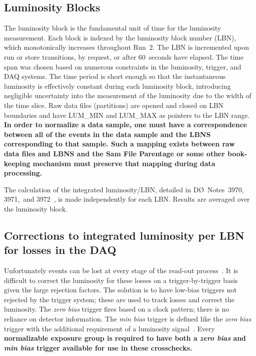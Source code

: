 \documentclass[12pt]{article}
\begin{document}
\subsection*{Luminosity Blocks}
The luminosity block is the fundamental unit of time for the
luminosity measurement.  Each block is indexed by the luminosity block
number (LBN), which monotonically increases throughout Run~2.  The LBN
is incremented upon run or store transitions, by request, or after
60~seconds have elapsed.  The time span was chosen based on numerous
constraints in the luminosity, trigger, and DAQ systems.  The time
period is short enough so that the instantaneous luminosity is
effectively constant during each luminosity block, introducing
negligible uncertainty into the measurement of the luminosity due to
the width of the time slice.  Raw data files (partitions) are opened
and closed on LBN boundaries and have LUM\_MIN and LUM\_MAX as pointers
to the LBN range. \bf
In order to normalize a data sample, one must have a correspondence between
all of the events in the data sample and the LBNS corresponding to that sample.
Such a mapping exists between raw data files and LBNS and the Sam File Parentage
or some other book-keeping mechanism must preserve that mapping during data processing. \rm


 The calculation of the integrated luminosity/LBN, detailed in
D\O~Notes~3970, 3971,~and 3972~\cite{3970,3971,3972}, is made
independently for each LBN.  Results are averaged over the luminosity
block.


\subsection*{Corrections to integrated luminosity per LBN for losses in the DAQ}
Unfortunately events can be lost at every stage of the read-out
process~\cite{3972}.  It is difficult to correct the luminosity for
these losses on a trigger-by-trigger basis given the large rejection
factors.  The solution is to have low-bias triggers not rejected by
the trigger system; these are used to track losses and correct the
luminosity.  The {\it zero bias} trigger fires based on a clock
pattern; there is no reliance on detector information.  The {\it min
bias} trigger is defined like the {\it zero bias} trigger with the
additional requirement of a luminosity signal~\cite{3973}.  Every
\bf normalizable \rm exposure group is required to have both a {\it zero bias} and {\it
min bias} trigger available for use in these crosschecks.
\end{document}
